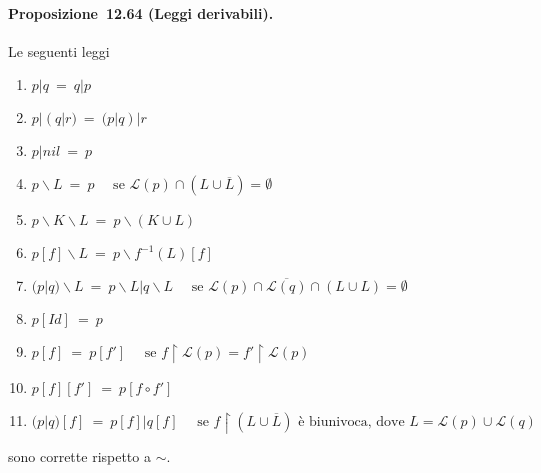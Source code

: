 \documentclass[a4paper,twosides]{report}
\begin{document}
\paragraph{Proposizione~12.64 (Leggi derivabili).} Le seguenti leggi
\begin{enumerate}
\item $p|q\ =\ q|p$
\item $p|(q|r)\ =\ (p|q)|r$
\item $p|nil\ =\ p$
\item $p \backslash L \ =\  p\quad\text{ se }\mathcal{L}(p) \cap (L \cup \overline{L}) = \emptyset$
\item $p \backslash K \backslash L \ =\  p \backslash (K \cup L)$
\item $p[f] \backslash L \ =\  p \backslash f^{-1} (L)[f]$
\item $(p|q) \backslash L \ =\  p \backslash L|q \backslash L\quad\text{ se }\mathcal{L}(p) \cap \overline{\mathcal{L}(q)} \cap (L \cup L) = \emptyset$
\item $p[Id] \ =\  p$
\item $p[f] \ =\  p[f']\quad\text{ se }f \upharpoonright \mathcal{L}(p) = f'\upharpoonright \mathcal{L}(p)$
\item $p[f][f'] \ =\  p[f \circ f']$
\item $(p|q)[f] \ =\  p[f]|q[f]\quad\text{ se }f \upharpoonright (L \cup \overline{L})\text{ è biunivoca, dove }L = \mathcal{L}(p) \cup \mathcal{L}(q)$
\end{enumerate}
sono corrette rispetto a $\sim$.
\end{document}
